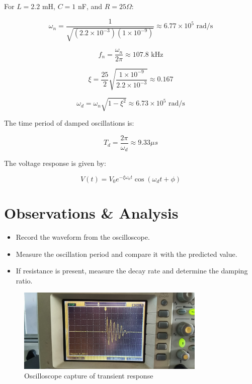 \documentclass[a4paper,12pt]{article}
\begin{document}
For $L = 2.2$ mH, $C = 1$ nF, and $R = 25 \Omega$:

\begin{equation}
\omega_n = \frac{1}{\sqrt{(2.2 \times 10^{-3})(1 \times 10^{-9})}}
\approx 6.77 \times 10^5 \text{ rad/s}
\end{equation}

\begin{equation}
f_n = \frac{\omega_n}{2\pi} \approx 107.8 \text{ kHz}
\end{equation}

\begin{equation}
\xi = \frac{25}{2} \sqrt{\frac{1 \times 10^{-9}}{2.2 \times 10^{-3}}} \approx 0.167
\end{equation}

\begin{equation}
\omega_d = \omega_n \sqrt{1 - \xi^2} \approx 6.73 \times 10^5 \text{ rad/s}
\end{equation}

The time period of damped oscillations is:

\begin{equation}
T_d = \frac{2\pi}{\omega_d} \approx 9.33 \mu s
\end{equation}

The voltage response is given by:

\begin{equation}
V(t) = V_0 e^{-\xi \omega_n t} \cos(\omega_d t + \phi)
\end{equation}

\section*{Observations \& Analysis}
\begin{itemize}
    \item Record the waveform from the oscilloscope.
    \item Measure the oscillation period and compare it with the predicted value.
    \item If resistance is present, measure the decay rate and determine the damping ratio.
\end{itemize}

\begin{figure}[h]
    \centering
    \includegraphics[width=0.8\textwidth]{figs/observation.jpeg}
    \caption{Oscilloscope capture of transient response}
    \label{fig:observation}
\end{figure}
\end{document}
